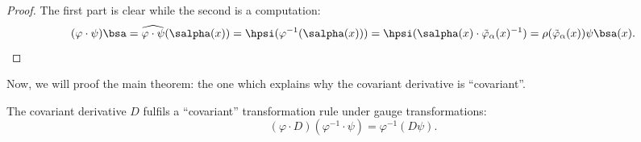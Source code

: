 \begin{proof}
The first part is clear while the second is a computation:
\begin{equation}
    (\varphi\cdot\psi)\bsa=\widehat{\varphi\cdot\psi}(\salpha(x))
                         =\hpsi(\varphi^{-1}(\salpha(x)))
			 =\hpsi(\salpha(x)\cdot\tilde{\varphi}_{\alpha}(x)^{-1})
			 =\rho(\tilde{\varphi}_{\alpha}(x))\psi\bsa(x).
\end{equation}
\end{proof}

Now, we will proof the main theorem: the one which explains why the covariant derivative is ``covariant''.

\begin{theorem}\label{th:covariance}
The covariant derivative $D$ fulfils a ``covariant'' transformation rule under gauge transformations:
\begin{equation}\label{eq:covariance_math}
      (\varphi\cdot D)(\varphi^{-1}\cdot \psi)=\varphi^{-1}(D\psi).
\end{equation}
\end{theorem}

